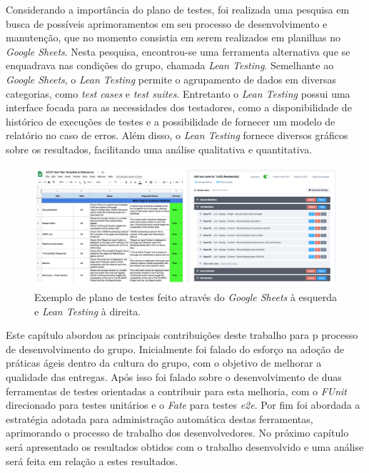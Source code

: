 Considerando a importância do plano de testes, foi realizada uma pesquisa em busca de possíveis aprimoramentos em seu processo de desenvolvimento e manutenção, que no momento consistia em serem realizados em planilhas no \emph{Google Sheets}. Nesta pesquisa, encontrou-se uma ferramenta alternativa que se enquadrava nas condições do grupo, chamada \emph{Lean Testing}. Semelhante ao \emph{Google Sheets}, o \emph{Lean Testing} permite o agrupamento de dados em diversas categorias, como \emph{test cases} e \emph{test suites}. Entretanto o \emph{Lean Testing} possui uma interface focada para as necessidades dos testadores, como a disponibilidade de histórico de execuções de testes e a possibilidade de fornecer um modelo de relatório no caso de erros. Além disso, o \emph{Lean Testing} fornece diversos gráficos sobre os resultados, facilitando uma análise qualitativa e quantitativa.

\begin{figure}[H]
    \centering
    \includegraphics[width=15cm]{source/4-solucao/images/plano-testes.png}
    \caption{Exemplo de plano de testes feito através do \emph{Google Sheets} à esquerda e \emph{Lean Testing} à direita.}
    \label{fig:plano-testesfig:teste-unitario}
\end{figure}

Este capítulo abordou as principais contribuições deste trabalho para p processo de desenvolvimento do grupo. Inicialmente foi falado do esforço na adoção de práticas ágeis dentro da cultura do grupo, com o objetivo de melhorar a qualidade das entregas. Após isso foi falado sobre o desenvolvimento de duas ferramentas de testes orientadas a contribuir para esta melhoria, com o \emph{FUnit} direcionado para testes unitários e o \emph{Fate} para testes \emph{e2e}. Por fim foi abordada a estratégia adotada para administração automática destas ferramentas, aprimorando o processo de trabalho dos desenvolvedores. No próximo capítulo será apresentado os resultados obtidos com o trabalho desenvolvido e uma análise será feita em relação a estes resultados.